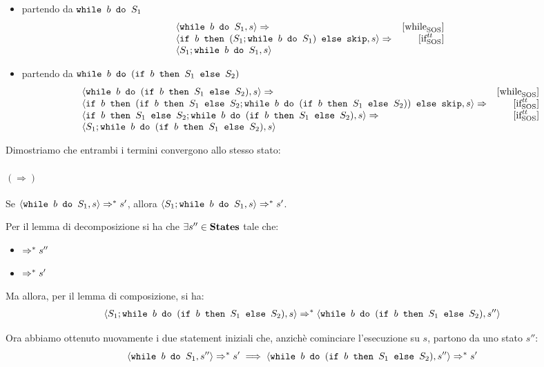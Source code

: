 \begin{itemize}
  \item partendo da $\wbS{b}{S_1}$
  $$
\begin{array}{lr}
\confSs{\wbS{b}{S_1}}{s} \Rar{} &
\whileSOS \\
\confSs{\ifABC{b}{(S_1;\wbS{b}{S_1})}{\skipForFriends}}{s} \Rar{} &
\ifttSOS \\
\confSs{S_1;\wbS{b}{S_1}}{s} &
\end{array}
  $$
  \item partendo da $\wbS{b}{(\ifABC{b}{S_1}{S_2})}$
  $$
\begin{array}{lr}
\confSs{\wbS{b}{(\ifABC{b}{S_1}{S_2})}}{s} \Rar{} &
\whileSOS \\
\confSs{\ifABC{b}
              {(\ifABC{b}{S_1}{S_2}; \wbS{b}{(\ifABC{b}{S_1}{S_2})})}
              {\skipForFriends}}
       {s} \Rar{} &
\ifttSOS \\
\confSs{\ifABC{b}{S_1}{S_2}; \wbS{b}{(\ifABC{b}{S_1}{S_2})}}
       {s} \Rar{} &
\ifttSOS \\
\confSs{S_1; \wbS{b}{(\ifABC{b}{S_1}{S_2})}}{s}
\end{array}
  $$
\end{itemize}

Dimostriamo che entrambi i termini convergono allo stesso
stato:

\paragraph{$(\Rightarrow)$}

Se $\confSs{\wbS{b}{S_1}}{s} \Rar{*} s'$, allora
$\confSs{S_1;\wbS{b}{S_1}}{s} \Rar{*} s'$.

Per il lemma di decomposizione si ha che $\exists s'' \in \states$ tale che:
\begin{itemize}
  \item {} $\Rar{*} s''$
  \item {} $\Rar{*} s'$
\end{itemize}

Ma allora, per il lemma di composizione, si ha:
\begin{align*}
\confSs{S_1; \wbS{b}{(\ifABC{b}{S_1}{S_2})}}{s}
\Rar{*}
\confSs{\wbS{b}{(\ifABC{b}{S_1}{S_2})}}{s''}
\end{align*}

Ora abbiamo ottenuto nuovamente i due statement iniziali che, anzichè
cominciare l'esecuzione su $s$, partono da uno stato $s''$:
$$
\confSs{\wbS{b}{S_1}}{s''} \Rar{*} s'
  \implies
\confSs{\wbS{b}{(\ifABC{b}{S_1}{S_2})}}{s''} \Rar{*} s'
$$


